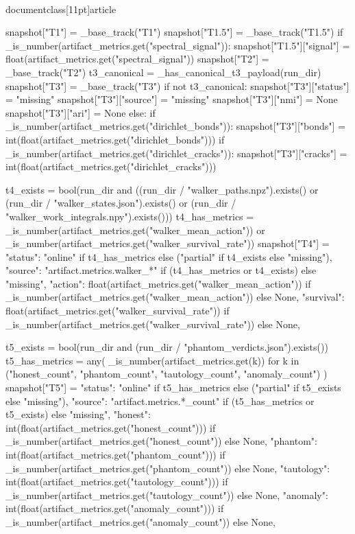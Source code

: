 \\documentclass[11pt]{article}
\begin{document}
\begin{CodeBlock}
{    snapshot["T1"] = _base_track("T1")
    snapshot["T1.5"] = _base_track("T1.5")
    if _is_number(artifact_metrics.get("spectral_signal")):
        snapshot["T1.5"]["signal"] = float(artifact_metrics.get("spectral_signal"))
    snapshot["T2"] = _base_track("T2")
    t3_canonical = _has_canonical_t3_payload(run_dir)
    snapshot["T3"] = _base_track("T3")
    if not t3_canonical:
        snapshot["T3"]["status"] = "missing"
        snapshot["T3"]["source"] = "missing"
        snapshot["T3"]["nmi"] = None
        snapshot["T3"]["ari"] = None
    else:
        if _is_number(artifact_metrics.get("dirichlet_bonds")):
            snapshot["T3"]["bonds"] = int(float(artifact_metrics.get("dirichlet_bonds")))
        if _is_number(artifact_metrics.get("dirichlet_cracks")):
            snapshot["T3"]["cracks"] = int(float(artifact_metrics.get("dirichlet_cracks")))

    t4_exists = bool(run_dir and ((run_dir / "walker_paths.npz").exists() or (run_dir / "walker_states.json").exists() or (run_dir / "walker_work_integrals.npy").exists()))
    t4_has_metrics = _is_number(artifact_metrics.get("walker_mean_action")) or _is_number(artifact_metrics.get("walker_survival_rate"))
    snapshot["T4"] = {
        "status": "online" if t4_has_metrics else ("partial" if t4_exists else "missing"),
        "source": "artifact.metrics.walker_*" if (t4_has_metrics or t4_exists) else "missing",
        "action": float(artifact_metrics.get("walker_mean_action")) if _is_number(artifact_metrics.get("walker_mean_action")) else None,
        "survival": float(artifact_metrics.get("walker_survival_rate")) if _is_number(artifact_metrics.get("walker_survival_rate")) else None,
    }

    t5_exists = bool(run_dir and (run_dir / "phantom_verdicts.json").exists())
    t5_has_metrics = any(
        _is_number(artifact_metrics.get(k))
        for k in ("honest_count", "phantom_count", "tautology_count", "anomaly_count")
    )
    snapshot["T5"] = {
        "status": "online" if t5_has_metrics else ("partial" if t5_exists else "missing"),
        "source": "artifact.metrics.*_count" if (t5_has_metrics or t5_exists) else "missing",
        "honest": int(float(artifact_metrics.get("honest_count"))) if _is_number(artifact_metrics.get("honest_count")) else None,
        "phantom": int(float(artifact_metrics.get("phantom_count"))) if _is_number(artifact_metrics.get("phantom_count")) else None,
        "tautology": int(float(artifact_metrics.get("tautology_count"))) if _is_number(artifact_metrics.get("tautology_count")) else None,
        "anomaly": int(float(artifact_metrics.get("anomaly_count"))) if _is_number(artifact_metrics.get("anomaly_count")) else None,
    }

}
\end{CodeBlock}
\end{document}
